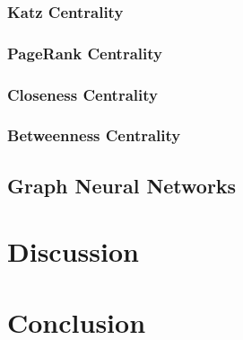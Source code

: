 \documentclass[journal,twoside,web]{ieeecolor}
\begin{document}
\subsubsection{Katz Centrality}
\subsubsection{PageRank Centrality}
\subsubsection{Closeness Centrality}
\subsubsection{Betweenness Centrality}


\subsection{Graph Neural Networks}
\label{sec:gnn}

\section{Discussion}
\label{sec:discussion}

\section{Conclusion}
\label{sec:conclusion}
\end{document}
